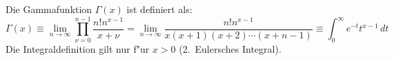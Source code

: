 \documentclass{article}
\begin{document}
\noindent
Die Gammafunktion $\Gamma(x)$ ist definiert als:
\[ \Gamma(x)\equiv\lim_{n\to\infty}\prod_{\nu=0}^{n-1}\frac{n!n^{x-1}}{x+\nu}
	    = \lim_{n\to\infty}\frac{n!n^{x-1}}{x(x+1)(x+2)\cdots(x+n-1)}
	    \equiv\int_0^\infty e^{-t}t^{x-1}\,dt \]
Die Integraldefinition gilt nur f"ur $x>0$ (2.\ Eulersches Integral).
\end{document}
